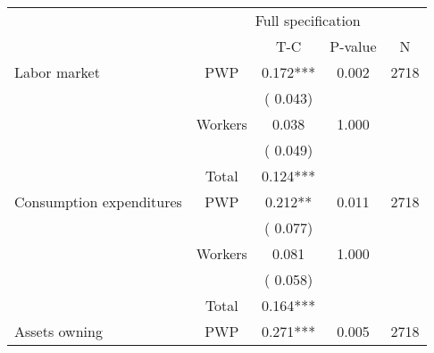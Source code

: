 
\begin{tabular}{l*{4}{c}}\hline&\multicolumn{4}{c}{Full specification} \\ \cmidrule(r){2-5} & {} & {T-C} & {P-value} & {N}  \\ \midrule
 Labor market                 &       PWP     &              0.172***                 &        0.002    & 2718                               \\  
                               &                               &       (       0.043)                              & &                                                                             \\ 
                               &       Workers         &              0.038                 &        1.000    &                                               \\ 
                               &                               &       (       0.049)                              & &                                                                             \\ 
\cmidrule{2-3}
                               &       Total           &              0.124***                 &    &                                               \\ 
\cmidrule{2-3}
 Consumption expenditures                 &       PWP     &              0.212**                 &        0.011    & 2718                               \\ 
                               &                               &       (       0.077)                              & &                                                                             \\ 
                               &       Workers         &              0.081                 &        1.000    &                                               \\ 
                               &                               &       (       0.058)                              & &                                                                             \\ 
\cmidrule{2-3}
                               &       Total           &              0.164***                 &    &                                               \\ 
\cmidrule{2-3}
 Assets owning                 &       PWP     &              0.271***                 &        0.005    & 2718                               \\ 

\end{tabular}

